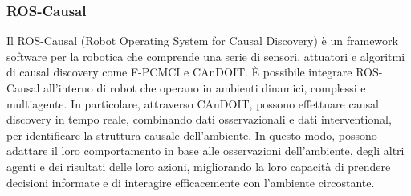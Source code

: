 \subsubsection*{ROS-Causal}
Il ROS-Causal (Robot Operating System for Causal Discovery) è un framework software per la robotica che comprende una serie
di sensori, attuatori e algoritmi di causal discovery come F-PCMCI e CAnDOIT. È possibile integrare ROS-Causal all'interno
di robot che operano in ambienti dinamici, complessi e multiagente.
In particolare, attraverso CAnDOIT, possono effettuare causal discovery in tempo reale, combinando dati osservazionali e dati
interventional, per identificare la struttura causale dell'ambiente. In questo modo, possono adattare il loro comportamento
in base alle osservazioni dell'ambiente, degli altri agenti e dei risultati delle loro azioni, migliorando la loro capacità
di prendere decisioni informate e di interagire efficacemente con l'ambiente circostante.
